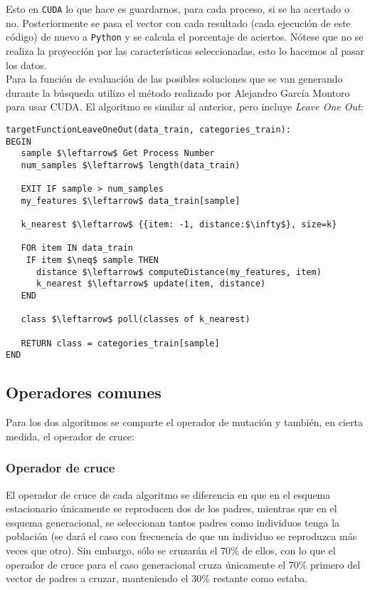\documentclass[11pt,leqno]{article}
\begin{document}
	Esto en \texttt{CUDA} lo que hace es guardarnos, para cada proceso, si se ha acertado o no. Posteriormente se pasa el vector con cada resultado (cada ejecución de este código) de nuevo a \texttt{Python} y se calcula el porcentaje de aciertos. Nótese que no se realiza la proyección por las características seleccionadas, esto lo hacemos al pasar los datos.\\
	Para la función de evaluación de las posibles soluciones que se van generando durante la búsqueda utilizo el método realizado por Alejandro García Montoro para usar CUDA. El algoritmo es similar al anterior, pero incluye \textit{Leave One Out}:

\newpage
\begin{lstlisting}[mathescape=true]
targetFunctionLeaveOneOut(data_train, categories_train):
BEGIN
   sample $\leftarrow$ Get Process Number
   num_samples $\leftarrow$ length(data_train)
   
   EXIT IF sample > num_samples
   my_features $\leftarrow$ data_train[sample]
   
   k_nearest $\leftarrow$ {{item: -1, distance:$\infty$}, size=k}
	
   FOR item IN data_train
    IF item $\neq$ sample THEN
      distance $\leftarrow$ computeDistance(my_features, item)
      k_nearest $\leftarrow$ update(item, distance)
   END
	
   class $\leftarrow$ poll(classes of k_nearest)
      
   RETURN class = categories_train[sample]
END
\end{lstlisting}

\subsection{Operadores comunes}
	
	Para los dos algoritmos se comparte el operador de mutación y también, en cierta medida, el operador de cruce:
	
\subsubsection{Operador de cruce}

	El operador de cruce de cada algoritmo se diferencia en que en el esquema estacionario únicamente se reproducen dos de los padres, mientras que en el esquema generacional, se seleccionan tantos padres como individuos tenga la población (se dará el caso con frecuencia de que un individuo se reproduzca más veces que otro). Sin embargo, sólo se cruzarán el $70\%$ de ellos, con lo que el operador de cruce para el caso generacional cruza únicamente el $70\%$ primero del vector de padres a cruzar, manteniendo el $30\%$ restante como estaba. 
\end{document}
